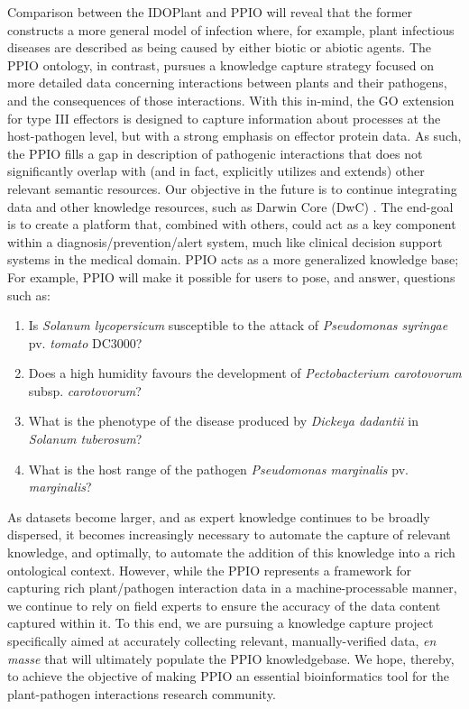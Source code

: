 \documentclass[sw]{iosart2c}
\begin{document}
Comparison between the IDOPlant and PPIO will reveal that the former constructs a more general model of infection where, for example, plant infectious diseases are described as being caused by either biotic or abiotic agents. The PPIO ontology, in contrast, pursues a knowledge capture strategy focused on more detailed data concerning interactions between plants and their pathogens, and the consequences of those interactions. With this in-mind, the GO extension for type III effectors is designed to capture information about processes at the host-pathogen level, but with a strong emphasis on effector protein data. As such, the PPIO fills a gap in description of pathogenic interactions that does not significantly overlap with (and in fact, explicitly utilizes and extends) other relevant semantic resources.  Our objective in the future is to continue integrating data and other knowledge resources, such as Darwin Core (DwC) \cite{Wieczorek2013}. The end-goal is to create a platform that, combined with others, could act as a key component within a diagnosis/prevention/alert system, much like clinical decision support systems in the medical domain. PPIO acts as a more generalized knowledge base; For example, PPIO will make it possible for users to pose, and answer, questions such as:

\begin{enumerate}
\item Is {\itshape Solanum lycopersicum} susceptible to the attack of {\itshape Pseudomonas syringae} pv. {\itshape tomato} DC3000?
\item Does a high humidity favours the development of {\itshape Pectobacterium carotovorum} subsp. {\itshape carotovorum}?
\item What is the phenotype of the disease produced by {\itshape Dickeya dadantii} in {\itshape Solanum tuberosum}?
\item What is the host range of the pathogen {\itshape Pseudomonas marginalis} pv. {\itshape marginalis}?

\end{enumerate}


As datasets become larger, and as expert knowledge continues to be broadly dispersed, it becomes increasingly necessary to automate the capture of relevant knowledge, and optimally, to automate the addition of this knowledge into a rich ontological context. However, while the PPIO represents a framework for capturing rich plant/pathogen interaction data in a machine-processable manner, we continue to rely on field experts to ensure the accuracy of the data content captured within it. To this end, we are pursuing a knowledge capture project specifically aimed at accurately collecting relevant, manually-verified data, {\itshape en masse} that will ultimately populate the PPIO knowledgebase. We hope, thereby, to achieve the objective of making PPIO an essential bioinformatics tool for the plant-pathogen interactions research community.
\end{document}
